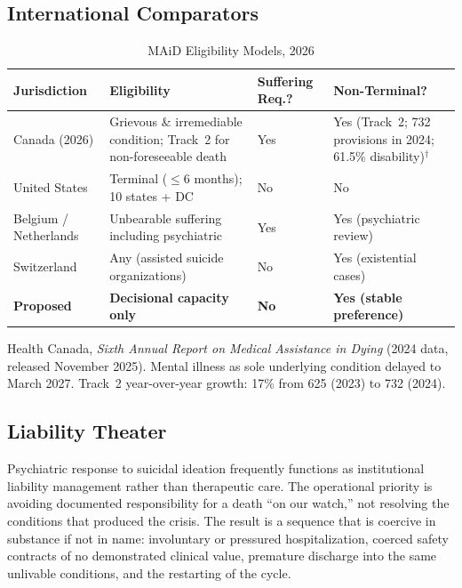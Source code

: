 \documentclass[11pt, letterpaper]{article}
\begin{document}
\subsection{International Comparators}

\begin{table}[h]
\centering
\small
\begin{threeparttable}
\begin{tabularx}{\textwidth}{l X X X}
\toprule
\textbf{Jurisdiction} & \textbf{Eligibility} & \textbf{Suffering Req.?} & \textbf{Non-Terminal?} \\
\midrule
Canada (2026)
  & Grievous \& irremediable condition; Track~2 for non-foreseeable death
  & Yes
  & Yes (Track~2; 732 provisions in 2024; 61.5\% disability)$^{\dagger}$ \\[4pt]
United States
  & Terminal ($\leq$6 months); 10 states + DC
  & No
  & No \\[4pt]
Belgium / Netherlands
  & Unbearable suffering including psychiatric
  & Yes
  & Yes (psychiatric review) \\[4pt]
Switzerland
  & Any (assisted suicide organizations)
  & No
  & Yes (existential cases) \\[4pt]
\textbf{Proposed}
  & \textbf{Decisional capacity only}
  & \textbf{No}
  & \textbf{Yes (stable preference)} \\
\bottomrule
\end{tabularx}
\begin{tablenotes}
  \footnotesize
  \item[$\dagger$]
    Health Canada, \textit{Sixth Annual Report on Medical Assistance in Dying}
    (2024 data, released November 2025). Mental illness as sole underlying condition
    delayed to March 2027. Track~2 year-over-year growth: 17\% from 625 (2023) to 732 (2024).
\end{tablenotes}
\end{threeparttable}
\caption{MAiD Eligibility Models, 2026}
\label{tab:comparators}
\end{table}

\subsection{Liability Theater}

Psychiatric response to suicidal ideation frequently functions as institutional liability
management rather than therapeutic care. The operational priority is avoiding documented
responsibility for a death ``on our watch,'' not resolving the conditions that produced the
crisis. The result is a sequence that is coercive in substance if not in name: involuntary or
pressured hospitalization, coerced safety contracts of no demonstrated clinical value,
premature discharge into the same unlivable conditions, and the restarting of the cycle.
\end{document}
